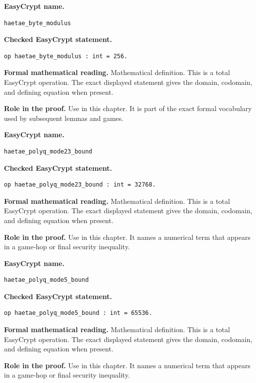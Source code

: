 \begin{formaldefinition}
\noindent\textbf{EasyCrypt name.}
\begin{lstlisting}[language=EasyCrypt,basicstyle=\ttfamily\scriptsize]
haetae_byte_modulus
\end{lstlisting}
\noindent\textbf{Checked EasyCrypt statement.}
\begin{lstlisting}[language=EasyCrypt,basicstyle=\ttfamily\scriptsize]
op haetae_byte_modulus : int = 256.
\end{lstlisting}
\noindent\textbf{Formal mathematical reading.}
Mathematical definition. This is a total EasyCrypt operation.  The exact displayed statement gives the domain, codomain, and defining equation when present.

\noindent\textbf{Role in the proof.}
Use in this chapter. It is part of the exact formal vocabulary used by subsequent lemmas and games.

\end{formaldefinition}

\begin{formaldefinition}
\noindent\textbf{EasyCrypt name.}
\begin{lstlisting}[language=EasyCrypt,basicstyle=\ttfamily\scriptsize]
haetae_polyq_mode23_bound
\end{lstlisting}
\noindent\textbf{Checked EasyCrypt statement.}
\begin{lstlisting}[language=EasyCrypt,basicstyle=\ttfamily\scriptsize]
op haetae_polyq_mode23_bound : int = 32768.
\end{lstlisting}
\noindent\textbf{Formal mathematical reading.}
Mathematical definition. This is a total EasyCrypt operation.  The exact displayed statement gives the domain, codomain, and defining equation when present.

\noindent\textbf{Role in the proof.}
Use in this chapter. It names a numerical term that appears in a game-hop or final security inequality.

\end{formaldefinition}

\begin{formaldefinition}
\noindent\textbf{EasyCrypt name.}
\begin{lstlisting}[language=EasyCrypt,basicstyle=\ttfamily\scriptsize]
haetae_polyq_mode5_bound
\end{lstlisting}
\noindent\textbf{Checked EasyCrypt statement.}
\begin{lstlisting}[language=EasyCrypt,basicstyle=\ttfamily\scriptsize]
op haetae_polyq_mode5_bound : int = 65536.
\end{lstlisting}
\noindent\textbf{Formal mathematical reading.}
Mathematical definition. This is a total EasyCrypt operation.  The exact displayed statement gives the domain, codomain, and defining equation when present.

\noindent\textbf{Role in the proof.}
Use in this chapter. It names a numerical term that appears in a game-hop or final security inequality.

\end{formaldefinition}

